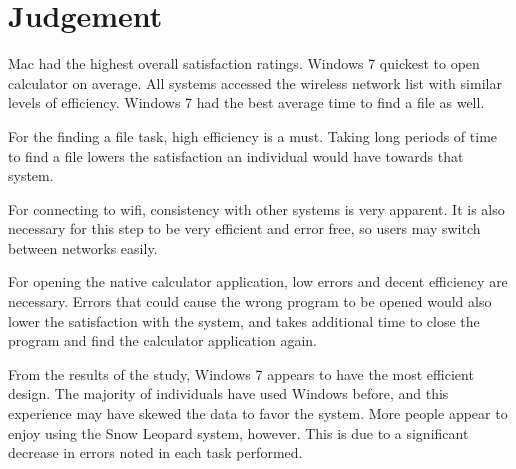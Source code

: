 \documentclass[11pt,letterpaper]{report}
\begin{document}
\section{Judgement}
Mac had the highest overall satisfaction ratings. Windows 7 quickest to open calculator on average. All systems accessed the wireless network list with similar levels of efficiency. Windows 7 had the best average time to find a file as well. 

For the finding a file task, high efficiency is a must. Taking long periods of time to find a file lowers the satisfaction an individual would have towards that system. 

For connecting to wifi, consistency with other systems is very apparent. It is also necessary for this step to be very efficient and error free, so users may switch between networks easily. 

For opening the native calculator application, low errors and decent efficiency are necessary. Errors that could cause the wrong program to be opened would also lower the satisfaction with the system, and takes additional time to close the program and find the calculator application again. 

From the results of the study, Windows 7 appears to have the most efficient design. The majority of individuals have used Windows before, and this experience may have skewed the data to favor the system. More people appear to enjoy using the Snow Leopard system, however. This is due to a significant decrease in errors noted in each task performed. 
%
\end{document}
